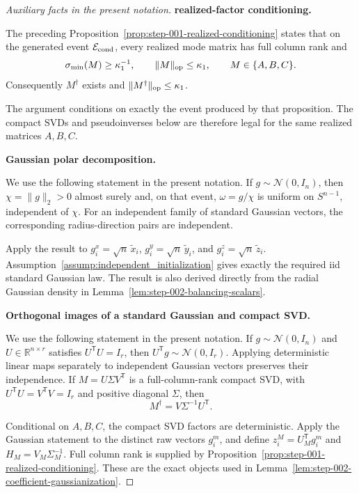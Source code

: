 \begin{proof}[Auxiliary facts in the present notation]


\medskip\noindent\textbf{realized-factor conditioning.}\par

The preceding Proposition~\ref{prop:step-001-realized-conditioning} states that
on the generated event \(\mathcal E_{\rm cond}\), every realized mode matrix
has full column rank and
\[
  \sigma_{\min}(M)\ge\kappa_1^{-1},\qquad
  \|M\|_{\rm op}\le\kappa_1,
  \qquad M\in\{A,B,C\}.
\]
Consequently \(M^\dagger\) exists and
\(\|M^\dagger\|_{\rm op}\le\kappa_1\).

The argument conditions on exactly the
event produced by that proposition. The compact SVDs and pseudoinverses below
are therefore legal for the same realized matrices \(A,B,C\).


\medskip\noindent\textbf{Gaussian polar decomposition.}\par

We use the following statement in the present notation. If \(g\sim\mathcal N(0,I_n)\), then
\(\chi=\|g\|_2>0\) almost surely and, on that event,
\(\omega=g/\chi\) is uniform on \(S^{n-1}\), independent of \(\chi\). For an
independent family of standard Gaussian vectors, the corresponding
radius-direction pairs are independent.

Apply the result to
\(g_i^x=\sqrt n\,\widetilde x_i\),
\(g_i^y=\sqrt n\,\widetilde y_i\), and
\(g_i^z=\sqrt n\,\widetilde z_i\). Assumption~\ref{assump:independent_initialization}
gives exactly the required iid standard Gaussian law. The result is also
derived directly from the radial Gaussian density in
Lemma~\ref{lem:step-002-balancing-scalars}.


\medskip\noindent\textbf{Orthogonal images of a standard Gaussian and compact SVD.}\par

We use the following statement in the present notation. If \(g\sim\mathcal N(0,I_n)\) and
\(U\in\mathbb R^{n\times r}\) satisfies \(U^{\mathsf T}U=I_r\), then
\(U^{\mathsf T}g\sim\mathcal N(0,I_r)\). Applying deterministic linear maps
separately to independent Gaussian vectors preserves their independence. If
\(M=U\Sigma V^{\mathsf T}\) is a full-column-rank compact SVD, with
\(U^{\mathsf T}U=V^{\mathsf T}V=I_r\) and positive diagonal \(\Sigma\), then
\[
  M^\dagger=V\Sigma^{-1}U^{\mathsf T}.
\]

Conditional on \(A,B,C\), the compact
SVD factors are deterministic. Apply the Gaussian statement to the distinct
raw vectors \(g_i^m\), and define
\(z_i^M=U_M^{\mathsf T}g_i^m\) and
\(H_M=V_M\Sigma_M^{-1}\). Full column rank is supplied by
Proposition~\ref{prop:step-001-realized-conditioning}. These are the exact
objects used in
Lemma~\ref{lem:step-002-coefficient-gaussianization}.

\end{proof}



